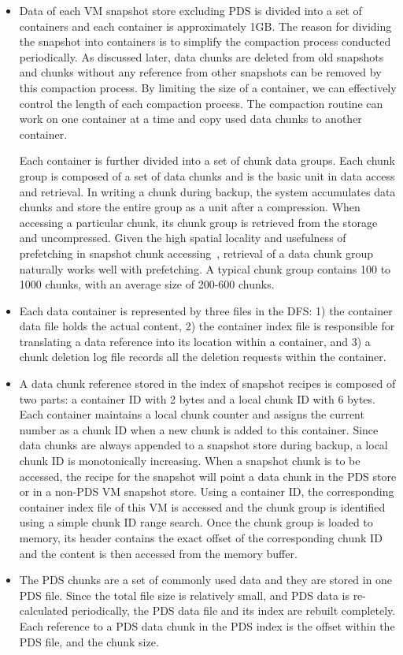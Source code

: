 \begin{itemize}
\item Data of each VM snapshot store excluding PDS is divided into a set of containers and 
each container is approximately 1GB. 
The reason for dividing the snapshot into containers is to simplify the compaction process
conducted periodically. As discussed later, data chunks are deleted from old snapshots
and chunks without any reference from other snapshots can be removed by this compaction process.
By limiting the size of a container, we can effectively control the length of each compaction process.
The compaction  routine can work on one container at a time and copy used data chunks to another container. 

Each container is further divided into a set of chunk data groups. Each chunk group is composed of
a set of data chunks and is the basic unit in data access and retrieval. 
In writing a chunk during backup, the system accumulates data chunks and store the entire
group as a unit after a compression.
When accessing a particular chunk, its chunk group is retrieved from the storage
and uncompressed. Given the high spatial locality and usefulness of prefetching  in 
snapshot chunk accessing~\cite{Guo2011,foundation08},
retrieval of  a data chunk  group naturally works well with prefetching. 
A  typical chunk group contains 100 to 1000 chunks, with an average size of 
200-600 chunks.

\item Each data container is represented by three files in the DFS:
1) the container data file holds the actual content, 
2) the container index file is responsible for translating a data reference
into its location within a container, and 
3) a chunk deletion log file records all the deletion requests within  the container.

\item A data chunk reference stored in the index of snapshot recipes
is composed of two parts: a container ID with 2 bytes and a local chunk ID with 6 bytes.
Each container maintains a local  chunk counter and assigns the current number 
as a chunk ID  when  a new chunk is added to this  container. 
Since data chunks are always appended to a snapshot store during backup, 
a local chunk ID is monotonically increasing.
When a snapshot chunk is to be accessed, the recipe for the snapshot will point a data chunk
in the PDS store or in a non-PDS VM snapshot  store. 
Using  a container ID, the corresponding container index file of this VM is accessed and 
the chunk group is identified using a simple chunk ID range search. Once the chunk group is loaded to memory, 
its header contains the exact offset of the corresponding chunk ID and the content is then accessed from the memory buffer.

\item The PDS chunks are a set of commonly used data and they are stored in one PDS file.
Since the total file size is relatively small, and
PDS data is re-calculated periodically, the PDS data file and its index are rebuilt completely. 
Each reference to a PDS data chunk in the PDS index is the offset within the PDS file, and the chunk size.

\end{itemize}

